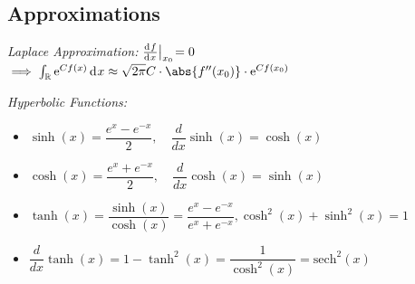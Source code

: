 \subsection{Approximations}

\emph{Laplace Approximation:}
$\deriv{f}{x} \big\vert_{x_0} \!= 0$\\
$\implies \int_{\mathbb R} \eu^{C f(x)} \diff x \approx \sqrt{2\pi} C \cdot \abs{f''(x_0)} \cdot \eu^{C f(x_0)}$

\emph{Hyperbolic Functions:}\\
\begin{itemize}
    \item $\sinh(x)=\dfrac{e^x - e^{-x}}{2},\quad \dfrac{d}{dx} \sinh(x)= \cosh(x)$ \\
    \item $\cosh(x) = \dfrac{e^x + e^{-x}}{2}, \quad \dfrac{d}{dx} \cosh(x)= \sinh(x)$\\
    \item $ \tanh(x) = \dfrac{\sinh(x)}{\cosh(x)}=\dfrac{e^x - e^{-x}}{e^x + e^{-x}}, \cosh^2(x) + \sinh^2(x) = 1 $\\
    \item $\dfrac{d}{dx} \tanh(x)= 1-\tanh^2(x)=\dfrac{1}{\cosh^2(x)}=\text{sech}^2(x)$
\end{itemize}
